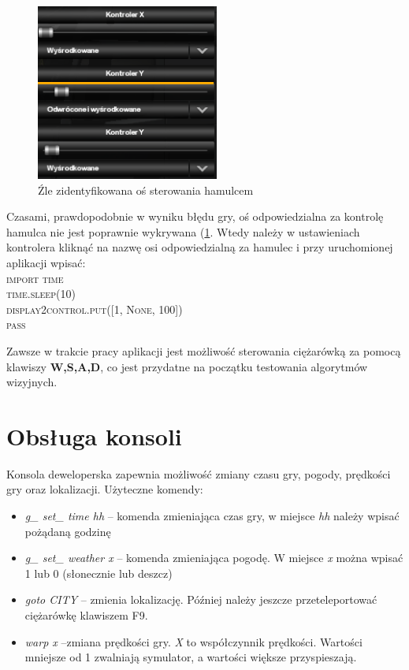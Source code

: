 \begin{figure}
  \centering
  \includegraphics[width=6cm]{img/appendix1_bad_controller.png}
  \caption{Źle zidentyfikowana oś sterowania hamulcem}
  \label{fig:appendix1_bad_controller}
\end{figure}

Czasami, prawdopodobnie w wyniku błędu gry, oś odpowiedzialna za kontrolę hamulca nie jest poprawnie wykrywana (\ref{fig:appendix1_bad_controller}. 
Wtedy należy w ustawieniach kontrolera kliknąć na nazwę osi odpowiedzialną za hamulec i przy uruchomionej aplikacji wpisać:\\ \textsc{import time \\
time.sleep(10)\\
display2control.put([1, None, 100])\\
pass\\}

Zawsze w trakcie pracy aplikacji jest możliwość sterowania ciężarówką za pomocą klawiszy \textbf{W,S,A,D}, co jest przydatne na początku testowania algorytmów wizyjnych.

\section{Obsługa konsoli}
Konsola deweloperska zapewnia możliwość zmiany czasu gry, pogody, prędkości gry oraz lokalizacji. Użyteczne komendy:
\begin{itemize}
\item \textit{g\_ set\_ time hh} -- komenda zmieniająca czas gry, w miejsce \textit{hh} należy wpisać pożądaną godzinę
\item \textit{g\_ set\_ weather x} -- komenda zmieniająca pogodę. W miejsce \textit{x} można wpisać 1 lub 0 (słonecznie lub deszcz)
\item \textit{goto CITY} -- zmienia lokalizację. Później należy jeszcze przeteleportować ciężarówkę klawiszem F9.
\item \textit{warp x} --zmiana prędkości gry. \textit{X} to współczynnik prędkości. Wartości mniejsze od 1 zwalniają symulator, a wartości większe przyspieszają.
\end{itemize}
